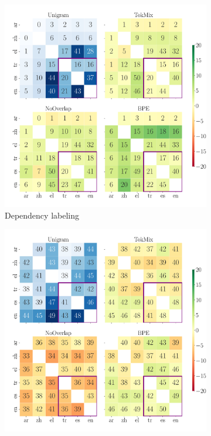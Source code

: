 \begin{figure}[tb!]
    \centering
    \begin{subfigure}[b]{1.0\linewidth}
        \centering
        \includegraphics[width=0.9\linewidth]{figures/UD_F1_transfer_.pdf}

        \caption{Dependency labeling}
        \label{fig:ud_transfer}
    \end{subfigure}
    \begin{subfigure}[b]{1.0\linewidth}
        \centering
        \includegraphics[width=0.9\linewidth]{figures/XNLI_Acc_transfer_.pdf}
        

\end{subfigure}
\end{figure}
